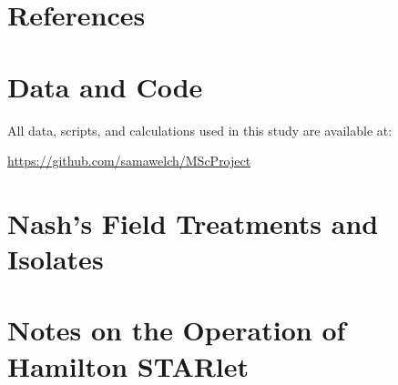 \documentclass[final,1p,times]{elsarticle}
\begin{document}
\section{References}
\label{S:7}


\begin{appendices}

\section{Data and Code}
\label{A:1}

All data, scripts, and calculations used in this study are available at: 

\url{https://github.com/samawelch/MScProject}


\section{Nash's Field Treatments and Isolates}
\label{A:2}


\section{Notes on the Operation of Hamilton STARlet}
\label{A:3}
\end{appendices}
\end{document}
